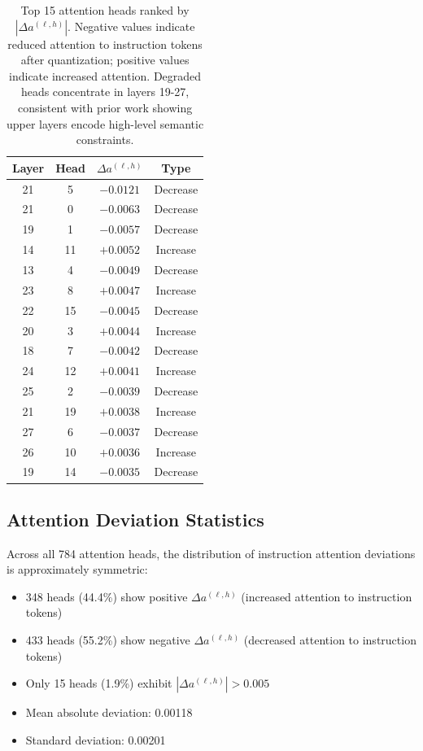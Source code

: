 \begin{table}[htbp]
\centering
\small
\begin{tabular}{@{}cccc@{}}
\toprule
\textbf{Layer} & \textbf{Head} & \textbf{$\Delta a^{(\ell,h)}$} & \textbf{Type} \\
\midrule
21 & 5  & $-0.0121$ & Decrease \\
21 & 0  & $-0.0063$ & Decrease \\
19 & 1  & $-0.0057$ & Decrease \\
14 & 11 & $+0.0052$ & Increase \\
13 & 4  & $-0.0049$ & Decrease \\
23 & 8  & $+0.0047$ & Increase \\
22 & 15 & $-0.0045$ & Decrease \\
20 & 3  & $+0.0044$ & Increase \\
18 & 7  & $-0.0042$ & Decrease \\
24 & 12 & $+0.0041$ & Increase \\
25 & 2  & $-0.0039$ & Decrease \\
21 & 19 & $+0.0038$ & Increase \\
27 & 6  & $-0.0037$ & Decrease \\
26 & 10 & $+0.0036$ & Increase \\
19 & 14 & $-0.0035$ & Decrease \\
\bottomrule
\end{tabular}
\caption{Top 15 attention heads ranked by $|\Delta a^{(\ell,h)}|$. Negative 
values indicate reduced attention to instruction tokens after quantization; 
positive values indicate increased attention. Degraded heads concentrate in 
layers 19-27, consistent with prior work showing upper layers encode high-level 
semantic constraints.}
\label{tab:top-degraded-heads}
\end{table}

\subsection{Attention Deviation Statistics}
\label{app:attention-distribution}

Across all 784 attention heads, the distribution of instruction attention 
deviations is approximately symmetric:
\begin{itemize}
    \item 348 heads (44.4\%) show positive $\Delta a^{(\ell,h)}$ (increased 
          attention to instruction tokens)
    \item 433 heads (55.2\%) show negative $\Delta a^{(\ell,h)}$ (decreased 
          attention to instruction tokens)
    \item Only 15 heads (1.9\%) exhibit $|\Delta a^{(\ell,h)}| > 0.005$
    \item Mean absolute deviation: 0.00118
    \item Standard deviation: 0.00201
\end{itemize}

